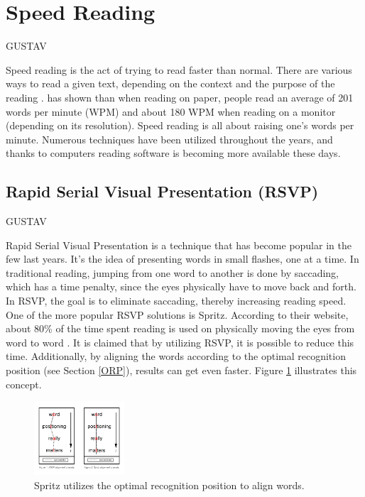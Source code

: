 \section{Speed Reading}
GUSTAV

Speed reading is the act of trying to read faster than normal. There are various ways to read a given text, depending on the context and the purpose of the reading \cite{differentWaysOfReading}. \cite{ziefle_effects_1998} has shown than when reading on paper, people read an average of 201 words per minute (WPM) and about 180 WPM when reading on a monitor (depending on its resolution). Speed reading is all about raising one's words per minute. Numerous techniques have been utilized throughout the years, and  thanks to computers reading software is becoming more available these days.


\subsection{Rapid Serial Visual Presentation (RSVP)}
GUSTAV

Rapid Serial Visual Presentation is a technique that has become popular in the few last years. It's the idea of presenting words in small flashes, one at a time. In traditional reading, jumping from one word to another is done by saccading, which has a time penalty, since the eyes physically have to move back and forth. In RSVP, the goal is to eliminate saccading, thereby increasing reading speed. One of the more popular RSVP solutions is Spritz. According to their website, about 80\% of the time spent reading is used on physically moving the eyes from word to word \cite{spritz}.	It is claimed that by utilizing RSVP, it is possible to reduce this time. Additionally, by aligning the words according to the optimal recognition position (see Section \ref{ORP}), results can get even faster. Figure \ref{fig:spritz_orp} illustrates this concept.

\begin{figure}[htbp]
\centering
\includegraphics[width=0.3\textwidth]{Pics/opr_spritz}
\caption{Spritz utilizes the optimal recognition position to align words.}
\label{fig:spritz_orp}
\end{figure}

